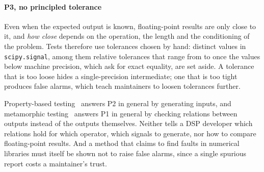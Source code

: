 \documentclass[10pt,conference]{IEEEtran}
\newcommand{\code}[1]{\texttt{#1}}
\begin{document}
\paragraph*{P3, no principled tolerance} Even when the expected output is
known, floating-point results are only close to it, and \emph{how close} depends
on the operation, the length and the conditioning of the problem. Tests
therefore use tolerances chosen by hand: \surveyScipyDistinctTol{} distinct
values in \code{scipy.signal}, among them \surveyScipyRelDistinct{} relative
tolerances that range from \surveyScipyRelMin{} to \surveyScipyRelMax{} once the
values below machine precision, which ask for exact equality, are set aside.
A tolerance that is too loose hides a single-precision intermediate; one that is
too tight produces false alarms, which teach maintainers to loosen tolerances
further.

Property-based testing~\cite{claessen2000quickcheck,maciver2019hypothesis}
answers P2 in general by generating inputs, and metamorphic
testing~\cite{chen2018metamorphic,segura2016metamorphic} answers P1 in general
by checking relations between outputs instead of the outputs themselves.
Neither tells a DSP developer which relations hold for which operator, which
signals to generate, nor how to compare floating-point results. And a method
that claims to find faults in numerical libraries must itself be shown not to
raise false alarms, since a single spurious report costs a maintainer's trust.
\end{document}
